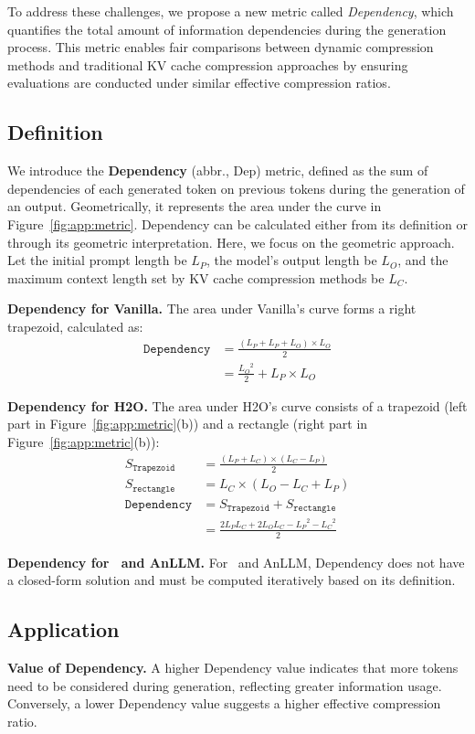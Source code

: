 To address these challenges, we propose a new metric called \textit{Dependency}, which quantifies the total amount of information dependencies during the generation process. 
This metric enables fair comparisons between dynamic compression methods and traditional KV cache compression approaches by ensuring evaluations are conducted under similar effective compression ratios.  
\subsection{Definition}
We introduce the \textbf{Dependency} (abbr., Dep) metric, defined as the sum of dependencies of each generated token on previous tokens during the generation of an output. 
Geometrically, it represents the area under the curve in Figure~\ref{fig:app:metric}. 
Dependency can be calculated either from its definition or through its geometric interpretation. 
Here, we focus on the geometric approach. 
Let the initial prompt length be \( L_P \), the model's output length be \( L_O \), and the maximum context length set by KV cache compression methods be \( L_C \).  

\textbf{Dependency for Vanilla.}
The area under Vanilla's curve forms a right trapezoid, calculated as:  
\[
\begin{aligned}
\texttt{Dependency} &= \frac{(L_P + L_P + L_O) \times L_O}{2} \\
&= \frac{{L_O}^2}{2} + L_P \times L_O
\end{aligned}
\]

\textbf{Dependency for H2O.}
The area under H2O's curve consists of a trapezoid (left part in Figure~\ref{fig:app:metric}(b)) and a rectangle (right part in Figure~\ref{fig:app:metric}(b)):  
\[
\begin{aligned}
S_\texttt{Trapezoid} &= \frac{(L_P + L_C) \times (L_C - L_P)}{2} \\
S_\texttt{rectangle} &= L_C \times (L_O - L_C + L_P) \\
\texttt{Dependency} &= S_\texttt{Trapezoid} + S_\texttt{rectangle} \\
&= \frac{2L_PL_C + 2L_OL_C - {L_P}^2 - {L_C}^2}{2}
\end{aligned}
\]

\textbf{Dependency for \ours~and AnLLM.}
For \ours~and AnLLM, Dependency does not have a closed-form solution and must be computed iteratively based on its definition. 

\subsection{Application}
\textbf{Value of Dependency.}
A higher Dependency value indicates that more tokens need to be considered during generation, reflecting greater information usage.
Conversely, a lower Dependency value suggests a higher effective compression ratio.  

